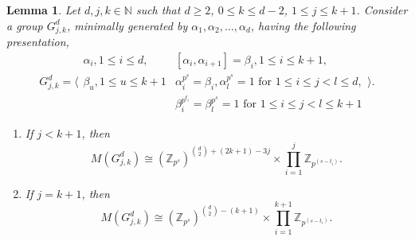 \documentclass[preprint,sort&compress,12pt]{elsarticle}
\newtheorem{lemma}[theorem]{Lemma}
\numberwithin{equation}{section}
\theoremstyle{definition}
\newcommand{\Z}{\mathbb{Z}}
\begin{document}
\begin{lemma}  \label{SchurG_{j,k}} 
Let $d,j,k \in \mathbb{N}$ such that $d \geq 2$, $0 \leq k \leq d-2$, ${1 \leq j \leq k+1}$.
   Consider a group $G_{j,k}^d$, minimally generated by $\alpha_1,\alpha_2,\ldots,\alpha_d$, having the following presentation,
\[G_{j,k}^d=\Biggl\langle 
\begin{array}{l|cl}
\alpha_i, 1 \le i \le d,	&  [\alpha_i,\alpha_{i+1}]=\beta_i, 1 \leq i \leq k+1,   \\
	\beta_u,1 \le u \le k+1 &  \alpha_i^{p^s}=\beta_i, \alpha_l^{p^s}=1 \text{ for } 1 \leq i \leq j <l \leq d, \\
     &  \beta_i^{p^{t_i}}= \beta_l^{p^s}=1 \text{ for }  1 \leq i \leq j < l \leq k+1
\end{array}
\Biggr\rangle.\]
\begin{enumerate} 
    \item [(i)]  If $j < k+1$, then 
$$M(G_{j,k}^d) \cong (\Z_{p^s})^{\binom{d}{2}+(2k+1)-3j} \times \prod_{i=1}^{j}\Z_{p^{(s-t_i)}} .
$$
\item [(ii)] If $j=k+1$, then 
$$M(G_{j,k}^d) \cong (\Z_{p^s})^{\binom{d}{2}-(k+1)} \times\prod_{i=1}^{k+1}\Z_{p^{(s-t_i)}} .$$
\end{enumerate}
\end{lemma}
\end{document}
